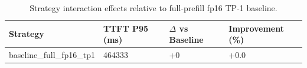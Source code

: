 \begin{table}
\caption{Strategy interaction effects relative to full-prefill fp16 TP-1 baseline.}
\label{tab:interactions}
\begin{tabular}{llll}
\toprule
Strategy & TTFT P95 (ms) & $\Delta$ vs Baseline & Improvement (\%) \\
\midrule
baseline\_full\_fp16\_tp1 & 464333 & +0 & +0.0 \\
\bottomrule
\end{tabular}
\end{table}
